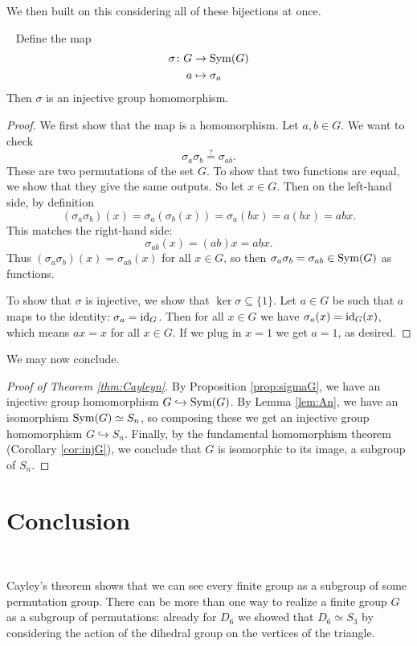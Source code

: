 \documentclass[11pt, reqno]{amsart}
\begin{document}
We then built on this considering all of these bijections at once.

\begin{prop}~\label{prop:sigmaG}
Define the map
\begin{align*}
\sigma \colon G &\to \operatorname{Sym}(G) \\
a &\mapsto \sigma_a 
\end{align*}
Then $\sigma$ is an injective group homomorphism.  
\end{prop}

\begin{proof}
We first show that the map is a homomorphism.  Let $a,b \in G$.  We want to check
\[ \sigma_a \sigma_b \overset{?}{=} \sigma_{ab}. \]
These are two permutations of the set $G$.  To show that two functions are equal, we show that they give the same outputs.  So let $x \in G$.  Then on the left-hand side, by definition
\[ (\sigma_a \sigma_b)(x) = \sigma_a(\sigma_b(x)) = \sigma_a(bx) = a(bx) = abx. \]
This matches the right-hand side:
\[ \sigma_{ab}(x)=(ab)x = abx. \]
Thus $(\sigma_a\sigma_b)(x)=\sigma_{ab}(x)$ for all $x \in G$, so then $\sigma_a \sigma_b = \sigma_{ab} \in \operatorname{Sym}(G)$ as functions.  

To show that $\sigma$ is injective, we show that $\ker \sigma \subseteq \{1\}$.  Let $a \in G$ be such that $a$ maps to the identity: $\sigma_a=\operatorname{id}_G$.  Then for all $x \in G$ we have $\sigma_a(x)=\operatorname{id}_G(x)$, which means $ax=x$ for all $x \in G$.  If we plug in $x=1$ we get $a=1$, as desired.
\end{proof}

We may now conclude.

\begin{proof}[Proof of Theorem \ref{thm:Cayleyn}]
By Proposition \ref{prop:sigmaG}, we have an injective group homomorphism $G \hookrightarrow \operatorname{Sym}(G)$.  By Lemma \ref{lem:An}, we have an isomorphism $\operatorname{Sym}(G) \simeq S_n$, so composing these we get an injective group homomorphism $G \hookrightarrow S_n$.  Finally, by the fundamental homomorphism theorem (Corollary 
\ref{cor:injG}), we conclude that $G$ is isomorphic to its image, a subgroup of $S_n$.  
\end{proof}

\section{Conclusion}~\label{sec:conc}

Cayley's theorem shows that we can see every finite group as a subgroup of some permutation group.  There can be more than one way to realize a finite group $G$ as a subgroup of permutations: already for $D_6$ we showed that $D_6 \simeq S_3$ by considering the action of the dihedral group on the vertices of the triangle.  
\end{document}
